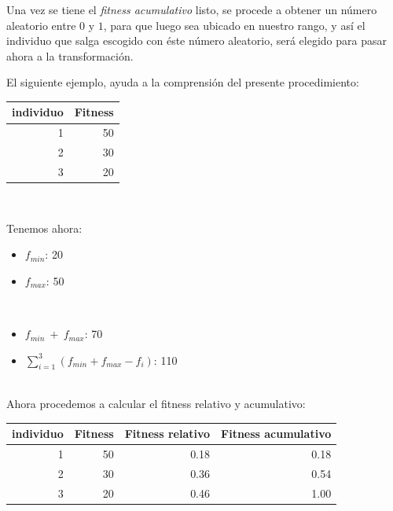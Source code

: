 Una vez se tiene el \emph{fitness acumulativo} listo, se procede a obtener un número aleatorio entre $0$ y $1$,
para que luego sea ubicado en nuestro rango, y así el individuo que salga escogido con éste número aleatorio, será
elegido para pasar ahora a la transformación.

El siguiente ejemplo, ayuda a la comprensión del presente procedimiento:\\

\begin{minipage}{0.2\textwidth}
	\begin{tabular}{|r|r|}
	\hline
	\textbf{individuo} & \textbf{Fitness} \\ \hline
	1 & 50 \\\hline
	2 & 30 \\\hline
	3 & 20 \\\hline
	\end{tabular}
\end{minipage}
\  \ 
\hfill \begin{minipage}{0.2\linewidth}
	Tenemos ahora:
	\begin{itemize}
		\item $f_{min}$: 20
		\item $f_{max}$: 50
	\end{itemize}
\end{minipage}
\  \
\hfill \begin{minipage}{0.35\textwidth}
	\vspace{0.4cm}
	\begin{itemize}
		\item $f_{min}\ +\ f_{max}$: 70
		\item $\sum\limits_{i=1}^{3} (f_{min} + f_{max} - f_{i})$: 110
	\end{itemize}
\end{minipage}\\


Ahora procedemos a calcular el fitness relativo y acumulativo:\\

\begin{center}
\begin{tabular}{|r|r|r|r|}
\hline
\textbf{individuo} & \textbf{Fitness} & \textbf{Fitness relativo} & \textbf{Fitness acumulativo}\\ \hline
1 & 50 & 0.18 & 0.18 \\\hline
2 & 30 & 0.36 & 0.54 \\\hline
3 & 20 & 0.46 & 1.00 \\\hline
\end{tabular}
\end{center}

